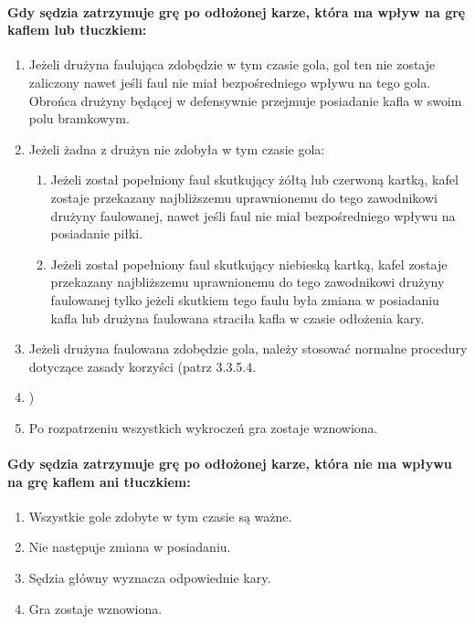 \documentclass[12pt]{article}
\begin{document}
\paragraph{Gdy sędzia zatrzymuje grę po odłożonej karze, która ma
	wpływ na grę kaflem lub tłuczkiem:}

\begin{enumerate}
	\item
	      Jeżeli drużyna faulująca zdobędzie w tym czasie gola, gol ten nie
	      zostaje zaliczony nawet jeśli faul nie miał bezpośredniego wpływu na
	      tego gola. Obrońca drużyny będącej w defensywnie przejmuje posiadanie
	      kafla w swoim polu bramkowym.
	\item
	      Jeżeli żadna z drużyn nie zdobyła w tym czasie gola:

	      \begin{enumerate}
		      \item
		            Jeżeli został popełniony faul skutkujący żółtą lub czerwoną kartką,
		            kafel zostaje przekazany najbliższemu uprawnionemu do tego
		            zawodnikowi drużyny faulowanej, nawet jeśli faul nie miał
		            bezpośredniego wpływu na posiadanie piłki.
		      \item
		            Jeżeli został popełniony faul skutkujący niebieską kartką, kafel
		            zostaje przekazany najbliższemu uprawnionemu do tego zawodnikowi
		            drużyny faulowanej tylko jeżeli skutkiem tego faulu była zmiana w
		            posiadaniu kafla lub drużyna faulowana straciła kafla w czasie
		            odłożenia kary.
	      \end{enumerate}
	\item
	      Jeżeli drużyna faulowana zdobędzie gola, należy stosować normalne
	      procedury dotyczące zasady korzyści (patrz 3.3.5.4.\item)
	\item
	      Po rozpatrzeniu wszystkich wykroczeń gra zostaje wznowiona.
\end{enumerate}

\paragraph{Gdy sędzia zatrzymuje grę po odłożonej karze, która nie
	ma wpływu na grę kaflem ani tłuczkiem:}

\begin{enumerate}
	\item
	      Wszystkie gole zdobyte w tym czasie są ważne.
	\item
	      Nie następuje zmiana w posiadaniu.
	\item
	      Sędzia główny wyznacza odpowiednie kary.
	\item
	      Gra zostaje wznowiona.
\end{enumerate}
\end{document}

